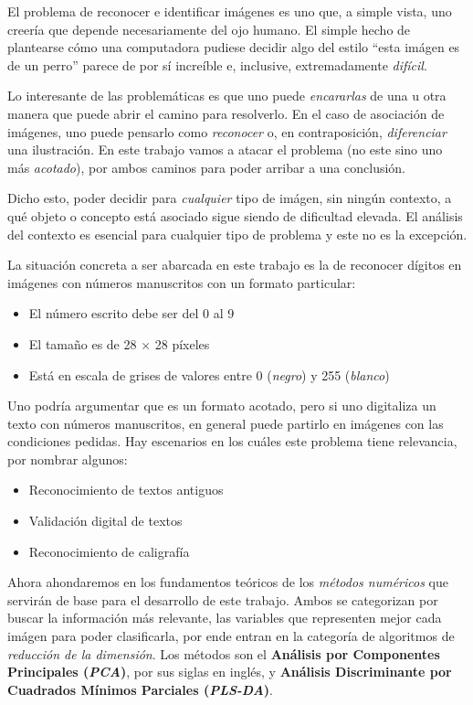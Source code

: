 El problema de reconocer e identificar im\'agenes es uno que, a simple vista, uno creer\'ia que depende necesariamente del ojo humano. El simple hecho de plantearse c\'omo una computadora pudiese decidir algo del estilo ``esta im\'agen es de un perro'' parece de por s\'i incre\'ible e, inclusive, extremadamente \textit{dif\'icil}.

Lo interesante de las problem\'aticas es que uno puede \textit{encararlas} de una u otra manera que puede abrir el camino para resolverlo. En el caso de asociaci\'on de im\'agenes, uno puede pensarlo como \textit{reconocer} o, en contraposici\'on, \textit{diferenciar} una ilustraci\'on. En este trabajo vamos a atacar el problema (no este sino uno m\'as \textit{acotado}), por ambos caminos para poder arribar a una conclusi\'on.

Dicho esto, poder decidir para \textit{cualquier} tipo de im\'agen, sin ning\'un contexto, a qu\'e objeto o concepto est\'a asociado sigue siendo de dificultad elevada. El an\'alisis del contexto es esencial para cualquier tipo de problema y este no es la excepci\'on.

La situaci\'on concreta a ser abarcada en este trabajo es la de reconocer d\'igitos en im\'agenes con n\'umeros manuscritos con un formato particular:

\begin{itemize}
\item El n\'umero escrito debe ser del 0 al 9
\item El tamaño es de 28 $\times$ 28 p\'ixeles
\item Est\'a en escala de grises de valores entre 0 (\textit{negro}) y 255 (\textit{blanco})
\end{itemize}

Uno podr\'ia argumentar que es un formato acotado, pero si uno digitaliza un texto con n\'umeros manuscritos, en general puede partirlo en im\'agenes con las condiciones pedidas. Hay escenarios en los cu\'ales este problema tiene relevancia, por nombrar algunos:

\begin{itemize}
\item Reconocimiento de textos antiguos
\item Validaci\'on digital de textos
\item Reconocimiento de caligraf\'ia
\end{itemize}

Ahora ahondaremos en los fundamentos te\'oricos de los \textit{m\'etodos num\'ericos} que servir\'an de base para el desarrollo de este trabajo. Ambos se categorizan por buscar la informaci\'on m\'as relevante, las variables que representen mejor cada im\'agen para poder clasificarla, por ende entran en la categor\'ia de algoritmos de \textit{reducci\'on de la dimensi\'on}. Los m\'etodos son el \textbf{An\'alisis por Componentes Principales (\textit{PCA})}, por sus siglas en ingl\'es, y \textbf{An\'alisis Discriminante por Cuadrados M\'inimos Parciales (\textit{PLS-DA})}.

